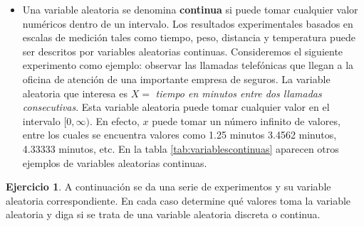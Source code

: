 \documentclass[
  11pt,
]{book}
\providecommand{\tightlist}{%
  \setlength{\itemsep}{0pt}\setlength{\parskip}{0pt}}
\theoremstyle{definition}
\theoremstyle{definition}
\theoremstyle{definition}
\newtheorem{exercise}{Ejercicio}[chapter]
\theoremstyle{definition}
\theoremstyle{remark}
\begin{document}
\begin{itemize}
\tightlist
\item
  Una variable aleatoria se denomina \textbf{continua} si puede tomar cualquier valor numéricos dentro de un intervalo. Los resultados experimentales basados en escalas de medición tales como tiempo, peso, distancia y temperatura puede ser descritos por variables aleatorias continuas. Consideremos el siguiente experimento como ejemplo: observar las llamadas telefónicas que llegan a la oficina de atención de una importante empresa de seguros. La variable aleatoria que interesa es \(X =\) \emph{tiempo en minutos entre dos llamadas consecutivas}. Esta variable aleatoria puede tomar cualquier valor en el intervalo \([0, \infty)\). En efecto, \(x\) puede tomar un número infinito de valores, entre los cuales se encuentra valores como 1.25 minutos 3.4562 minutos, 4.33333 minutos, etc. En la tabla \ref{tab:variablescontinuas} aparecen otros ejemplos de variables aleatorias continuas.
\end{itemize}

\begin{table}[H]
\centering
\caption{\label{tab:variablescontinuas}Ejemplos de variables aleatorias continuas}
\centering
{}
\end{table}

\begin{exercise}
A continuación se da una serie de experimentos y su variable aleatoria correspondiente. En cada caso determine qué valores toma la variable aleatoria y diga si se trata de una variable aleatoria discreta o continua.
\end{exercise}
\end{document}
